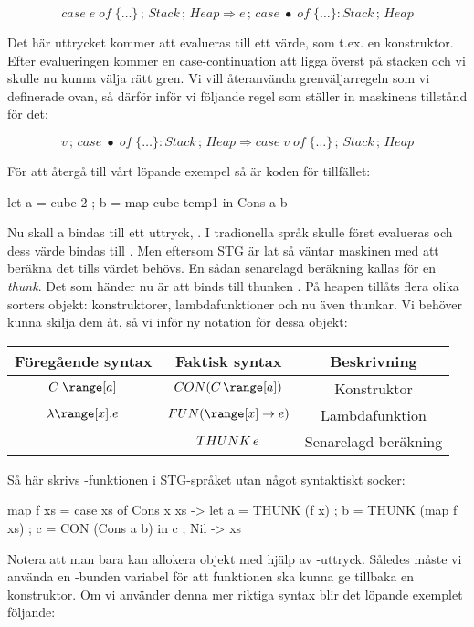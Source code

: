 \documentclass[../Core]{subfiles}
\begin{document}
\[
case\; e\; of\;\{\ldots\}\,;\, Stack\,;\, Heap\Rightarrow e\,;\, case\;\bullet\; of\;\{\ldots\}:Stack\,;\, Heap\]


Det här uttrycket kommer att evalueras till ett värde, som t.ex. en konstruktor.
Efter evalueringen kommer en case-continuation att ligga överst på stacken och vi skulle nu kunna välja
rätt gren. Vi vill återanvända grenväljarregeln som vi definerade
ovan, så därför inför vi följande regel som ställer in maskinens tillstånd för det:

\[
v\,;\, case\;\bullet\; of\;\{\ldots\}:Stack\,;\, Heap\Rightarrow case\; v\; of\;\{\ldots\}\,;\, Stack\,;\, Heap\]


För att återgå till vårt löpande exempel så är koden för tillfället:

\begin{codeEx}
let { a = cube 2
    ; b = map cube temp1
    } in Cons a b
\end{codeEx}

Nu skall a bindas till ett uttryck, . I tradionella språk skulle
 först evalueras och dess värde bindas till . Men eftersom STG
är lat så väntar maskinen med att beräkna det tills värdet behövs.
En sådan senarelagd beräkning kallas för en \emph{thunk}. Det som händer nu är att
 binds till thunken . På heapen tillåts flera olika
sorters objekt: konstruktorer, lambdafunktioner och nu även thunkar.
Vi behöver kunna skilja dem åt, så vi inför ny notation för dessa objekt:

\begin{tabular}{ccc}
Föregående syntax & Faktisk syntax & Beskrivning\tabularnewline
\hline
$C\;\range[a]$ & $\CON C{\range[a]}$ & Konstruktor\tabularnewline
$\lambda\range[x].e$ & $\FUN{\range[x]}e$ & Lambdafunktion\tabularnewline
- & $THUNK\,e$ & Senarelagd beräkning\tabularnewline
\end{tabular}

Så här skrivs -funktionen i STG-språket utan något syntaktiskt socker:

\begin{codeEx}
map f xs = case xs of
    { Cons x xs -> let { a = THUNK (f x)
                       ; b = THUNK (map f xs)
                       ; c = CON (Cons a b)
                       } in c
    ; Nil       -> xs
    }
\end{codeEx}

Notera att man bara kan allokera objekt med hjälp av -uttryck. Således
måste vi använda en -bunden variabel  för att funktionen ska kunna ge tillbaka en konstruktor.
Om vi använder denna mer riktiga syntax blir det löpande exemplet följande:
\end{document}
